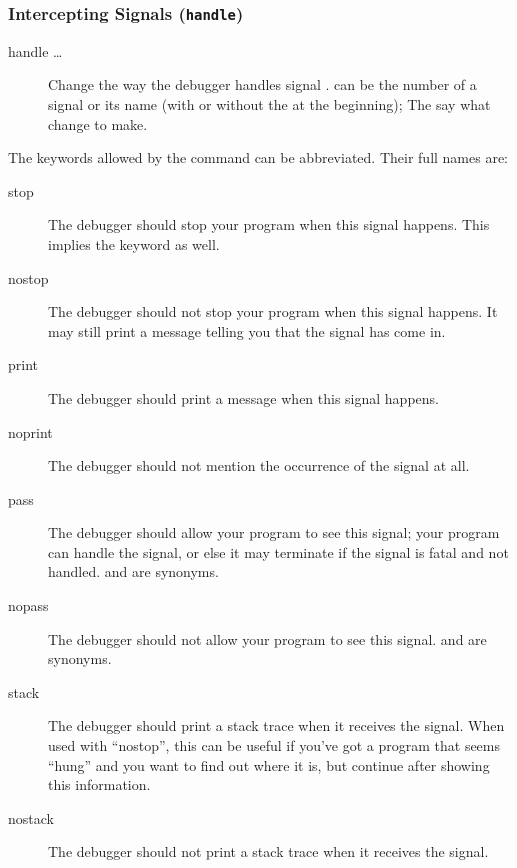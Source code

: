 \subsubsection{Intercepting Signals ({\tt handle})}\label{subsubsection-handle}

\begin{description}
\item[handle  \ldots]
Change the way the debugger handles signal .  
can be the number of a signal or its name (with or without the
 at the beginning); The  say what change to
make.
\end{description}

The keywords allowed by the  command can be abbreviated.
Their full names are:

\begin{description}
\item[stop]
The debugger should stop your program when this signal happens.  This implies
the  keyword as well.

\item[nostop]
The debugger should not stop your program when this signal happens.  It may
still print a message telling you that the signal has come in.

\item[print]
The debugger should print a message when this signal happens.

\item[noprint]
The debugger should not mention the occurrence of the signal at all.  

\item[pass]
The debugger should allow your program to see this signal; your program
can handle the signal, or else it may terminate if the signal is fatal
and not handled.   and  are synonyms.

\item[nopass]
The debugger should not allow your program to see this signal.
 and  are synonyms.

\item[stack]

The debugger should print a stack trace when it receives the
signal. When used with ``nostop'', this can be useful if you've got a
program that seems ``hung'' and you want to find out where it is, but
continue after showing this information.

\item[nostack]
The debugger should not print a stack trace when it receives the signal.
\end{description}

